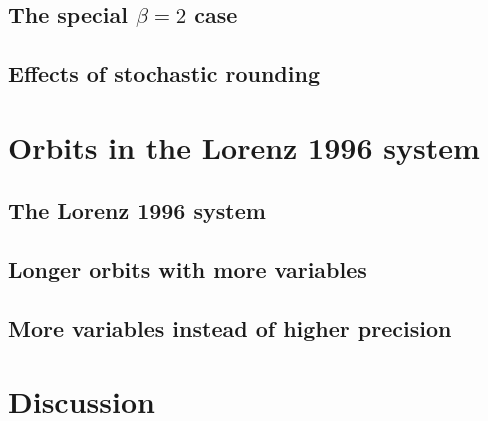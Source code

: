 \subsection{The special $\beta = 2$ case}
\subsection{Effects of stochastic rounding}

\section{Orbits in the Lorenz 1996 system}
\subsection{The Lorenz 1996 system}
\subsection{Longer orbits with more variables}
\subsection{More variables instead of higher precision}

\section{Discussion}